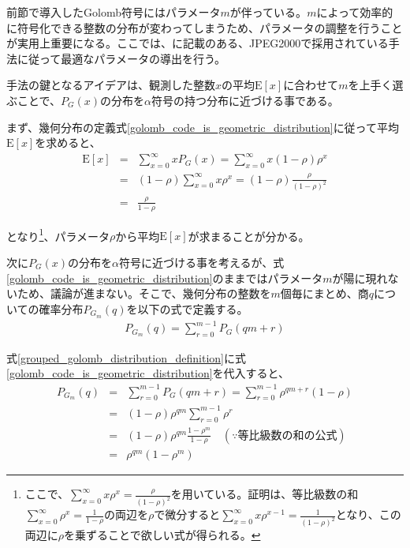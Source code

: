 \documentclass[uplatex,dvipdfmx,b5j,10pt]{jsbook}
\theoremstyle{definition}
\begin{document}
前節で導入したGolomb符号にはパラメータ$m$が伴っている。$m$によって効率的に符号化できる整数の分布が変わってしまうため、パラメータの調整を行うことが実用上重要になる。ここでは、\cite{optimalgolombparam}に記載のある、JPEG2000で採用されている手法に従って最適なパラメータの導出を行う。

手法の鍵となるアイデアは、観測した整数$x$の平均$\mathrm{E}[x]$に合わせて$m$を上手く選ぶことで、$P_{G}(x)$の分布を$\alpha$符号の持つ分布に近づける事である。

まず、幾何分布の定義式\ref{golomb_code_is_geometric_distribution}に従って平均$\textrm{E}[x]$を求めると、
\begin{eqnarray}
  \mathrm{E}[x] &=& \sum_{x=0}^{\infty} x P_{G}(x) = \sum_{x=0}^{\infty} x(1-\rho)\rho^{x} \nonumber \\
  &=& (1 - \rho) \sum_{x=0}^{\infty} x \rho^{x} = (1 - \rho) \frac{\rho}{(1 - \rho)^{2}} \nonumber \\
  &=& \frac{\rho}{1 - \rho} \label{mean_and_rho}
\end{eqnarray}

となり\footnote{ここで、$\sum_{x=0}^{\infty} x \rho^{x} = \frac{\rho}{(1-\rho)^{2}}$を用いている。証明は、等比級数の和$\sum_{x=0}^{\infty} \rho^{x} = \frac{1}{1-\rho}$の両辺を$\rho$で微分すると$\sum_{x = 0}^{\infty} x \rho^{x - 1} = \frac{1}{(1 - \rho)^{2}}$となり、この両辺に$\rho$を乗ずることで欲しい式が得られる。}、パラメータ$\rho$から平均$\textrm{E}[x]$が求まることが分かる。

次に$P_{G}(x)$の分布を$\alpha$符号に近づける事を考えるが、式\ref{golomb_code_is_geometric_distribution}のままではパラメータ$m$が陽に現れないため、議論が進まない。そこで、幾何分布の整数を$m$個毎にまとめ、商$q$についての確率分布$P_{G_{m}}(q)$を以下の式で定義する。
\begin{eqnarray}
  P_{G_{m}}(q) = \sum_{r=0}^{m-1} P_{G}(qm + r) \label{grouped_golomb_distribution_definition}
\end{eqnarray}

式\ref{grouped_golomb_distribution_definition}に式\ref{golomb_code_is_geometric_distribution}を代入すると、
\begin{eqnarray}
  P_{G_{m}}(q) &=& \sum_{r=0}^{m-1} P_{G}(qm + r) = \sum_{r=0}^{m-1} \rho^{qm+r}(1 - \rho) \nonumber \\
  &=& (1 - \rho) \rho^{qm} \sum_{r=0}^{m-1} \rho^{r} \nonumber \\
  &=& (1 - \rho) \rho^{qm} \frac{1 - \rho^{m}}{1 - \rho} \quad (\because 等比級数の和の公式) \nonumber \\
  &=& \rho^{qm} (1 - \rho^{m}) \label{grouped_golomb_distribution}
\end{eqnarray}
\end{document}
